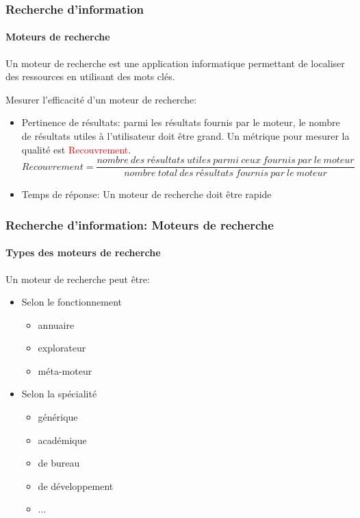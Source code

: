 \documentclass{beamer}
\begin{document}
\begin{frame}
\frametitle{Recherche d'information}
\framesubtitle{Moteurs de recherche}

\begin{definition}
	Un moteur de recherche est une application informatique permettant de localiser des ressources en utilisant des mots clés.
\end{definition}

Mesurer l'efficacité d'un moteur de recherche:
\begin{itemize}
	\item Pertinence de résultats: parmi les résultats fournis par le moteur, le nombre de résultats utiles à l'utilisateur doit être grand. Un métrique pour mesurer la qualité est \textcolor{red}{Recouvrement}.
	{\scriptsize \[ Recouvrement = \frac{nombre\ des\ résultats\ utiles\ parmi\ ceux\ fournis\ par\ le\ moteur}{nombre\ total\ des\ résultats\ fournis\ par\ le\ moteur} \]}
	\item Temps de réponse: Un moteur de recherche doit être rapide
\end{itemize}

\end{frame}

\begin{frame}
\frametitle{Recherche d'information: Moteurs de recherche}
\framesubtitle{Types des moteurs de recherche}

Un moteur de recherche peut être:
\begin{itemize}
	\item Selon le fonctionnement
	\begin{itemize}
		\item annuaire
		\item explorateur
		\item méta-moteur
	\end{itemize}

	\item Selon la spécialité
	\begin{itemize}
		\item générique
		\item académique
		\item de bureau 
		\item de développement
		\item ...
	\end{itemize}
\end{itemize} 

\end{frame}
\end{document}
